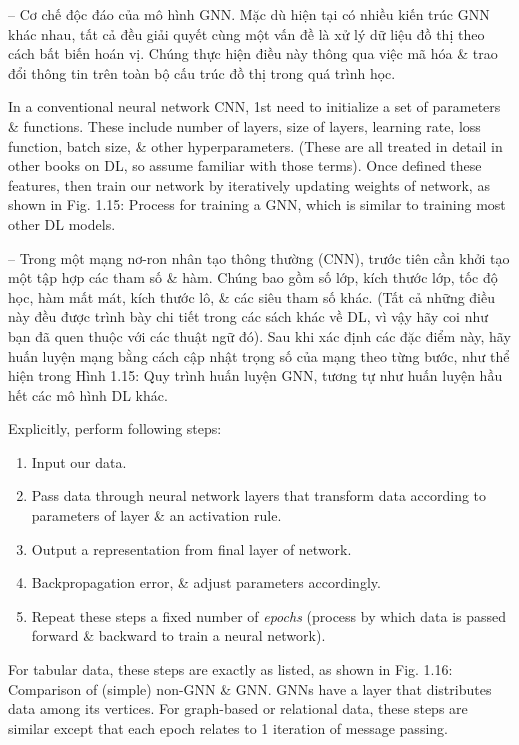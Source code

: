 \documentclass{article}
\begin{document}
\begin{itemize}
\begin{itemize}
\begin{itemize}
            -- {\sf Cơ chế độc đáo của mô hình GNN.} Mặc dù hiện tại có nhiều kiến trúc GNN khác nhau, tất cả đều giải quyết cùng một vấn đề là xử lý dữ liệu đồ thị theo cách bất biến hoán vị. Chúng thực hiện điều này thông qua việc mã hóa \& trao đổi thông tin trên toàn bộ cấu trúc đồ thị trong quá trình học.

            In a conventional neural network CNN, 1st need to initialize a set of parameters \& functions. These include number of layers, size of layers, learning rate, loss function, batch size, \& other hyperparameters. (These are all treated in detail in other books on DL, so assume familiar with those terms). Once defined these features, then train our network by iteratively updating weights of network, as shown in {\sf Fig. 1.15: Process for training a GNN, which is similar to training most other DL models.}

            -- Trong một mạng nơ-ron nhân tạo thông thường (CNN), trước tiên cần khởi tạo một tập hợp các tham số \& hàm. Chúng bao gồm số lớp, kích thước lớp, tốc độ học, hàm mất mát, kích thước lô, \& các siêu tham số khác. (Tất cả những điều này đều được trình bày chi tiết trong các sách khác về DL, vì vậy hãy coi như bạn đã quen thuộc với các thuật ngữ đó). Sau khi xác định các đặc điểm này, hãy huấn luyện mạng bằng cách cập nhật trọng số của mạng theo từng bước, như thể hiện trong {\sf Hình 1.15: Quy trình huấn luyện GNN, tương tự như huấn luyện hầu hết các mô hình DL khác.}

            Explicitly, perform following steps:
            \begin{enumerate}
                \item Input our data.
                \item Pass data through neural network layers that transform data according to parameters of layer \& an activation rule.
                \item Output a representation from final layer of network.
                \item Backpropagation error, \& adjust parameters accordingly.
                \item Repeat these steps a fixed number of {\it epochs} (process by which data is passed forward \& backward to train a neural network).
            \end{enumerate}
            For tabular data, these steps are exactly as listed, as shown in {\sf Fig. 1.16: Comparison of (simple) non-GNN \& GNN. GNNs have a layer that distributes data among its vertices.} For graph-based or relational data, these steps are similar except that each epoch relates to 1 iteration of message passing.


\end{itemize}
\end{itemize}
\end{itemize}
\end{document}
